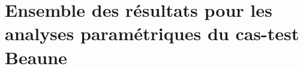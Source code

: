 \documentclass{book}
\begin{document}
	\tableofcontents
	
	
	
	

	
	
	
	
	
	
	
	
	\appendix
	\chapter{Ensemble des résultats pour les analyses paramétriques du cas-test Beaune}
	
	
	
	
\end{document}
